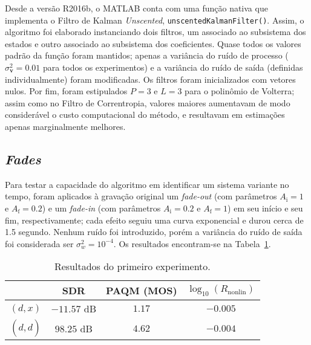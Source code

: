 Desde a versão R2016b, o MATLAB conta com uma função nativa que implementa o Filtro de Kalman \textit{Unscented}, \texttt{unscentedKalmanFilter()}. Assim, o algoritmo foi elaborado instanciando dois filtros, um associado ao subsistema dos estados e outro associado ao subsistema dos coeficientes. Quase todos os valores padrão da função foram mantidos; apenas a variância do ruído de processo ($\sigma_{\mathbf{v}}^2 = 0.01$ para todos os experimentos) e a variância do ruído de saída (definidas individualmente) foram modificadas. Os filtros foram inicializados com vetores nulos. Por fim, foram estipulados $P=3$ e $L=3$ para o polinômio de Volterra; assim como no Filtro de Correntropia, valores maiores aumentavam de modo considerável o custo computacional do método, e resultavam em estimações apenas marginalmente melhores.

\subsection{\textit{Fades}}

Para testar a capacidade do algoritmo em identificar um sistema variante no tempo, foram aplicados à gravação original um \textit{fade-out} (com parâmetros $A_\text{i} = 1$ e $A_\text{f} = 0.2$) e um \textit{fade-in} (com parâmetros $A_\text{i} = 0.2$ e $A_\text{f} = 1$) em seu início e seu fim, respectivamente; cada efeito seguiu uma curva exponencial e durou cerca de 1.5 segundo. Nenhum ruído foi introduzido, porém a variância do ruído de saída foi considerada ser $\sigma_w^2 = 10^{-4}$. Os resultados encontram-se na Tabela~\ref{tab:unscented:experiment-1}.
{\def\arraystretch{1.25}\tabcolsep=10pt
\begin{table}[!ht]
    \centering
    \caption[Resultados do primeiro experimento: \textit{fades}]{Resultados do primeiro experimento.}
    \label{tab:unscented:experiment-1}
    \begin{tabular}{cccc}
        \toprule
                         & SDR        & PAQM (MOS)   & $\log_{10}(R_{\text{nonlin}})$ \\
        \midrule
        $(d, x)$       & $-11.57$ dB & $1.17$  &  $-0.005$               \\
        $(d, \hat{d})$ & $98.25$ dB & $4.62$  &   $-0.004$              \\ \bottomrule
    \end{tabular}
\end{table}
}

